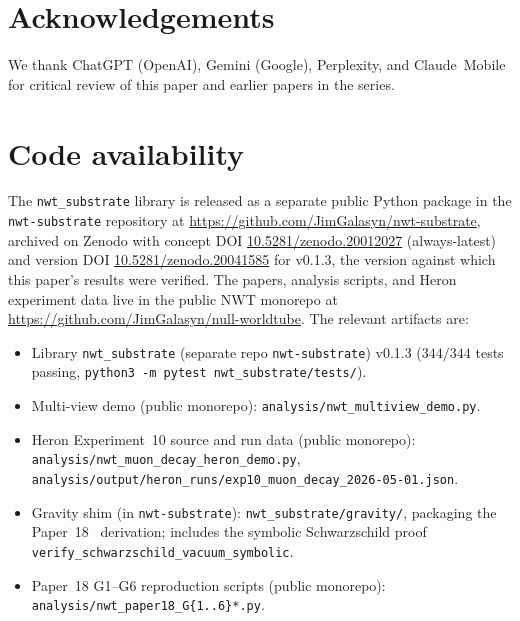 \documentclass[11pt]{article}
\newcommand{\nwtsub}{\texttt{nwt\_substrate}}
\begin{document}
\section*{Acknowledgements}

We thank ChatGPT (OpenAI), Gemini (Google), Perplexity, and
Claude~Mobile for critical review of this paper and earlier papers
in the series.

\section*{Code availability}

The \nwtsub{} library is released as a separate public Python
package in the \texttt{nwt-substrate} repository at
\url{https://github.com/JimGalasyn/nwt-substrate}, archived on
Zenodo with concept DOI
\href{https://doi.org/10.5281/zenodo.20012027}
{10.5281/zenodo.20012027} (always-latest) and version DOI
\href{https://doi.org/10.5281/zenodo.20041585}
{10.5281/zenodo.20041585} for v0.1.3, the version against which
this paper's results were verified.  The papers, analysis scripts,
and Heron experiment data live in the public NWT monorepo at
\url{https://github.com/JimGalasyn/null-worldtube}.  The relevant
artifacts are:
\begin{itemize}
\item Library \nwtsub{} (separate repo \texttt{nwt-substrate})
  v0.1.3 ($344/344$ tests passing,
  \texttt{python3 -m pytest nwt\_substrate/tests/}).
\item Multi-view demo (public monorepo):
  \texttt{analysis/nwt\_multiview\_demo.py}.
\item Heron Experiment~10 source and run data (public monorepo): \\
  \texttt{analysis/nwt\_muon\_decay\_heron\_demo.py}, \\
  \texttt{analysis/output/heron\_runs/exp10\_muon\_decay\_2026-05-01.json}.
\item Gravity shim (in \texttt{nwt-substrate}):
  \texttt{nwt\_substrate/gravity/}, packaging the
  Paper~18~\cite{paper18} derivation; includes the symbolic
  Schwarzschild proof \\
  \texttt{verify\_schwarzschild\_vacuum\_symbolic}.
\item Paper~18 G1--G6 reproduction scripts (public monorepo):
  \texttt{analysis/nwt\_paper18\_G\{1..6\}*.py}.
\end{itemize}
\end{document}
